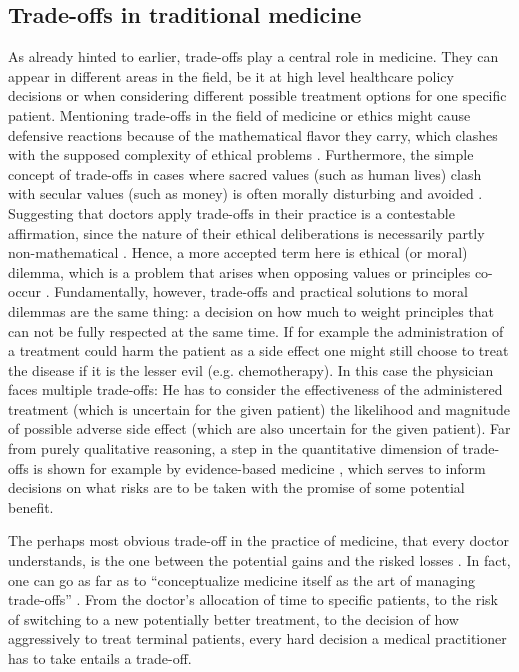 \subsection{Trade-offs in traditional medicine}
    As already hinted to earlier, trade-offs play a central role in medicine.
	They can appear in different areas in the field, be it at high level healthcare policy decisions or when considering different possible treatment options for one specific patient.
    Mentioning trade-offs in the field of medicine or ethics might cause defensive reactions because of the mathematical flavor they carry, which clashes with the supposed complexity of ethical problems \cite{Williamson2021}.
    Furthermore, the simple concept of trade-offs in cases where sacred values (such as human lives) clash with secular values (such as money) is often morally disturbing and avoided \cite{Tetlock2003}.
    Suggesting that doctors apply trade-offs in their practice is a contestable affirmation, since the nature of their ethical deliberations is necessarily partly non-mathematical \cite{Zerilli2019}.
    Hence, a more accepted term here is ethical (or moral) dilemma, which is a problem that arises when opposing values or principles co-occur \cite{Dijkstra2020}.
    Fundamentally, however, trade-offs and practical solutions to moral dilemmas are the same thing: a decision on how much to weight principles that can not be fully respected at the same time.
    If for example the administration of a treatment could harm the patient as a side effect one might still choose to treat the disease if it is the lesser evil (e.g. chemotherapy\cite{oronsky2016medical}).
    In this case the physician faces multiple trade-offs:
	He has to consider the effectiveness of the administered treatment (which is uncertain for the given patient) the likelihood and magnitude of possible adverse side effect (which are also uncertain for the given patient).
    Far from purely qualitative reasoning, a step in the quantitative dimension of trade-offs is shown for example by evidence-based medicine \cite{Launer2020}, which serves to inform decisions on what risks are to be taken with the promise of some potential benefit.

    The perhaps most obvious trade-off in the practice of medicine, that every doctor understands, is the one between the potential gains and the risked losses \cite{Launer2020}.
    In fact, one can go as far as to ``conceptualize medicine itself as the art of managing trade-offs'' \cite{Launer2020}.
    From the doctor's allocation of time to specific patients, to the risk of switching to a new potentially better treatment, to the decision of how aggressively to treat terminal patients, every hard decision a medical practitioner has to take entails a trade-off.

